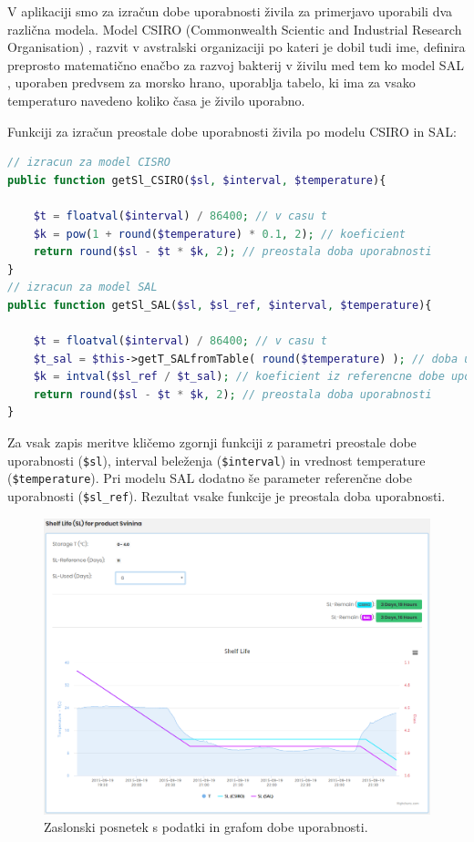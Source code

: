 \documentclass[a4paper, 12pt]{book}
\begin{document}
V aplikaciji smo za izračun dobe uporabnosti živila za primerjavo uporabili dva različna modela.
Model CSIRO (Commonwealth Scientic and Industrial Research Organisation) \cite{CSIRO-organizacija}, razvit v avstralski organizaciji po kateri je dobil tudi ime, definira preprosto matematično enačbo za razvoj bakterij v živilu med tem ko model SAL \cite{magistrska-marolt}, uporaben predvsem za morsko hrano, uporablja tabelo, ki ima za vsako temperaturo navedeno koliko časa je živilo uporabno.

Funkciji za izračun preostale dobe uporabnosti živila po modelu CSIRO in SAL:

\begin{lstlisting}[language=PHP, style=mystyle]
// izracun za model CISRO
public function getSl_CSIRO($sl, $interval, $temperature){

    $t = floatval($interval) / 86400; // v casu t
    $k = pow(1 + round($temperature) * 0.1, 2); // koeficient
    return round($sl - $t * $k, 2); // preostala doba uporabnosti
}
// izracun za model SAL
public function getSl_SAL($sl, $sl_ref, $interval, $temperature){

    $t = floatval($interval) / 86400; // v casu t
    $t_sal = $this->getT_SALfromTable( round($temperature) ); // doba uporabnosti pri temperaturi T prebrana iz tabele SAL
    $k = intval($sl_ref / $t_sal); // koeficient iz referencne dobe uporabnosti deljeno z $t_sal
    return round($sl - $t * $k, 2); // preostala doba uporabnosti
}
\end{lstlisting}

Za vsak zapis meritve kličemo zgornji funkciji z parametri preostale dobe uporabnosti (\verb=$sl=), interval beleženja (\verb=$interval=) in vrednost temperature (\verb=$temperature=). Pri modelu SAL dodatno še parameter referenčne dobe uporabnosti (\verb=$sl_ref=). Rezultat vsake funkcije je preostala doba uporabnosti.

\begin{figure}[h]
\begin{center}
\includegraphics[width=\textwidth]{slike/record_page_33.png}
\end{center}
\caption{Zaslonski posnetek s podatki in grafom dobe uporabnosti.}
\label{ss-record-page-sl}
\end{figure}
\end{document}
